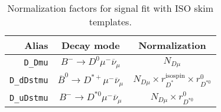 


\begin{landscape}
\begin{table}
\centering
\caption{
    Normalization factors for \Dz signal fit with ISO skim templates.
}
\label{tab:fit-norm-fact-d0}
\scriptsize

\begin{tabular}{r|c|c}
\toprule
           \textbf{Alias} &                                 \textbf{Decay mode}                                  &                                                                                                                                                                                  \textbf{Normalization}                                                                                                                                                                                  \\
\midrule
          \texttt{D\_Dmu} &                    $B^- \rightarrow D^0 \mu^- \overline{\nu}_\mu$                    &                                                                                                                                                                                       $N_{D \mu}$                                                                                                                                                                                        \\
       \texttt{D\_dDstmu} &             $\overline{B}^0 \rightarrow D^{*+} \mu^- \overline{\nu}_\mu$             &                                                                                                                                                             $N_{D \mu} \times r_{D^*}^\text{isospin} \times r_{D^{*0}}^{0}$                                                                                                                                                              \\
       \texttt{D\_uDstmu} &                  $B^- \rightarrow D^{*0} \mu^- \overline{\nu}_\mu$                   &                                                                                                                                                                            $N_{D \mu} \times r_{D^{*0}}^{0}$                                                                                                                                                                             \\

\end{tabular}
\end{table}
\end{landscape}
